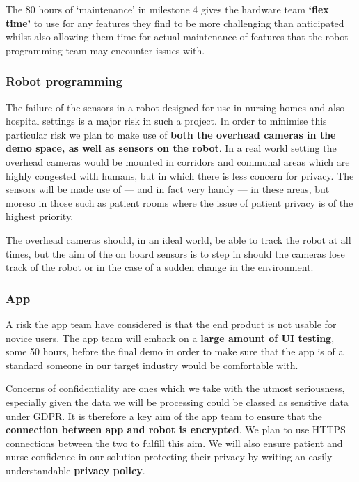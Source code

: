\documentclass{article}
\begin{document}
The 80 hours of `maintenance' in milestone 4 gives the hardware team {\bf `flex time'} to use for any features they find to be more challenging than anticipated whilst also allowing them time for actual maintenance of features that the robot programming team may encounter issues with.

\subsubsection{Robot programming}

The failure of the sensors in a robot designed for use in nursing homes and also hospital settings is a major risk in such a project. In order to minimise this particular risk we plan to make use of {\bf both the overhead cameras in the demo space, as well as sensors on the robot}. In a real world setting the overhead cameras would be mounted in corridors and communal areas which are highly congested with humans, but in which there is less concern for privacy. The sensors will be made use of --- and in fact very handy --- in these areas, but moreso in those such as patient rooms where the issue of patient privacy is of the highest priority.

The overhead cameras should, in an ideal world, be able to track the robot at all times, but the aim of the on board sensors is to step in should the cameras lose track of the robot or in the case of a sudden change in the environment.

\subsubsection{App}

A risk the app team have considered is that the end product is not usable for novice users. The app team will embark on a {\bf large amount of UI testing}, some 50 hours, before the final demo in order to make sure that the app is of a standard someone in our target industry would be comfortable with.

Concerns of confidentiality are ones which we take with the utmost seriousness, especially given the data we will be processing could be classed as sensitive data under GDPR. It is therefore a key aim of the app team to ensure that the {\bf connection between app and robot is encrypted}. We plan to use HTTPS connections between the two to fulfill this aim. We will also ensure patient and nurse confidence in our solution protecting their privacy by writing an easily-understandable {\bf privacy policy}. 
\end{document}
